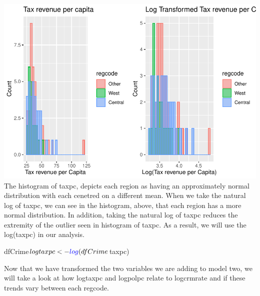 \documentclass[]{article}
\newenvironment{Shaded}{}{}
\newcommand{\KeywordTok}[1]{\textcolor[rgb]{0.00,0.00,1.00}{#1}}
\newcommand{\NormalTok}[1]{#1}
\newcommand{\OperatorTok}[1]{#1}
\newcommand{\StringTok}[1]{\textcolor[rgb]{0.00,0.50,0.50}{#1}}
\begin{document}
\includegraphics{Bagnard_Gaustad_Hartman_Leung_Lab_3_files/figure-latex/unnamed-chunk-67-1.pdf}
The histogram of taxpc, depicts each region as having an approximately
normal distribution with each cenetred on a different mean. When we take
the natural log of taxpc, we can see in the histogram, above, that each
region has a more normal distribution. In addition, taking the natural
log of taxpc reduces the extremity of the outlier seen in histogram of
taxpc. As a result, we will use the log(taxpc) in our analysis.

\begin{Shaded}
\begin{Highlighting}[]
\NormalTok{dfCrime}\OperatorTok{$}\NormalTok{logtaxpc <-}\StringTok{ }\KeywordTok{log}\NormalTok{(dfCrime}\OperatorTok{$}\NormalTok{taxpc)}
\end{Highlighting}
\end{Shaded}

Now that we have transformed the two variables we are adding to model
two, we will take a look at how logtaxpc and logpolpc relate to
logcrmrate and if these trends vary between each regcode.
\end{document}
